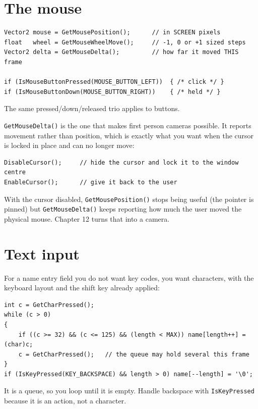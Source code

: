 \section{The mouse}

\begin{lstlisting}
Vector2 mouse = GetMousePosition();      // in SCREEN pixels
float   wheel = GetMouseWheelMove();     // -1, 0 or +1 sized steps
Vector2 delta = GetMouseDelta();         // how far it moved THIS frame

if (IsMouseButtonPressed(MOUSE_BUTTON_LEFT))  { /* click */ }
if (IsMouseButtonDown(MOUSE_BUTTON_RIGHT))    { /* held */ }
\end{lstlisting}

The same pressed/down/released trio applies to buttons.

\lstinline|GetMouseDelta()| is the one that makes first person cameras possible.
It reports movement rather than position, which is exactly what you want when
the cursor is locked in place and can no longer move:

\begin{lstlisting}
DisableCursor();     // hide the cursor and lock it to the window centre
EnableCursor();      // give it back to the user
\end{lstlisting}

With the cursor disabled, \lstinline|GetMousePosition()| stops being useful
(the pointer is pinned) but \lstinline|GetMouseDelta()| keeps reporting how much
the user moved the physical mouse. Chapter 12 turns that into a camera.


\section{Text input}

For a name entry field you do not want key codes, you want characters, with the
keyboard layout and the shift key already applied:

\begin{lstlisting}
int c = GetCharPressed();
while (c > 0)
{
    if ((c >= 32) && (c <= 125) && (length < MAX)) name[length++] = (char)c;
    c = GetCharPressed();   // the queue may hold several this frame
}
if (IsKeyPressed(KEY_BACKSPACE) && length > 0) name[--length] = '\0';
\end{lstlisting}

It is a queue, so you loop until it is empty. Handle backspace with
\lstinline|IsKeyPressed| because it is an action, not a character.

